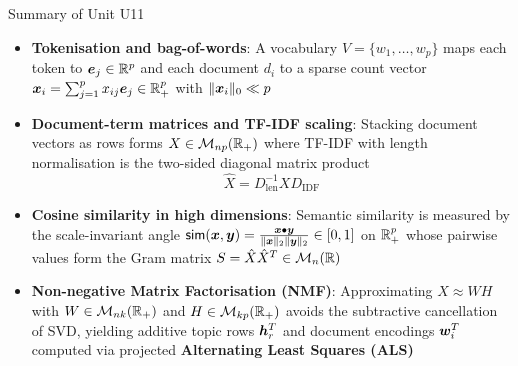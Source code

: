 \documentclass[aspectratio=169]{beamer}\usepackage[]{graphicx}\usepackage[]{xcolor}
\begin{document}
\begin{frame}{Summary of Unit U11}
\begin{itemize}
\item \textbf{Tokenisation and bag-of-words}: A vocabulary $V = \{w_1, \ldots, w_p\}$ maps each token to $\bm{e}_j \in \mathbb{R}^p$ and each document $d_i$ to a sparse count vector $\bm{x}_i = \sum_{j=1}^p x_{ij} \bm{e}_j \in \mathbb{R}_+^p$ with $\|\bm{x}_i\|_0 \ll p$
\vfill
\item \textbf{Document-term matrices and TF-IDF scaling}: Stacking document vectors as rows forms $X \in \mathcal{M}_{np}(\mathbb{R}_+)$ where TF-IDF with length normalisation is the two-sided diagonal matrix product
\[
\hat{X} = D_{\text{len}}^{-1} X D_{\text{IDF}}
\]
\vfill
\item \textbf{Cosine similarity in high dimensions}: Semantic similarity is measured by the scale-invariant angle $\mathsf{sim}(\bm{x}, \bm{y}) = \frac{\bm{x} \bullet \bm{y}}{\|\bm{x}\|_2 \|\bm{y}\|_2} \in [0, 1]$ on $\mathbb{R}_+^p$ whose pairwise values form the Gram matrix $S = \hat{X} \hat{X}^T \in \mathcal{M}_n(\mathbb{R})$
\vfill
\item \textbf{Non-negative Matrix Factorisation (NMF)}: Approximating $X \approx W H$ with $W \in \mathcal{M}_{nk}(\mathbb{R}_+)$ and $H \in \mathcal{M}_{kp}(\mathbb{R}_+)$ avoids the subtractive cancellation of SVD, yielding additive topic rows $\bm{h}_r^T$ and document encodings $\bm{w}_i^T$ computed via projected \textbf{Alternating Least Squares (ALS)}
\end{itemize}
\end{frame}
\end{document}

